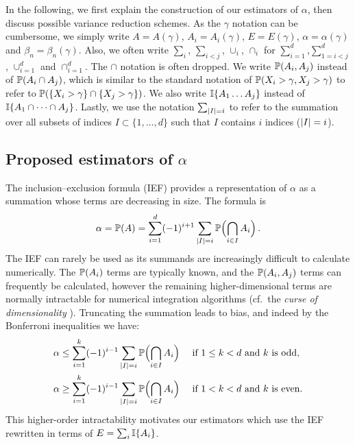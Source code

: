 In the following, we first explain the construction of our estimators of $\alpha$, then discuss possible variance reduction schemes. As the $\gamma$ notation can be cumbersome, we simply write $A=A(\gamma)$, $A_i = A_i(\gamma)$, $E = E(\gamma)$, $\alpha = \alpha(\gamma)$ and $\beta_n = \beta_n(\gamma)$. Also, we often write $\sum_i$, $\sum_{i<j}$, $\cup_i$, $\cap_i$ for $\sum_{i=1}^d$,$\sum_{1=i<j}^d$, $\cup_{i=1}^d$ and $\cap_{i=1}^d$.
The $\cap$ notation is often dropped. We write $\operatorname{{\mathbb P}}(A_i, A_j)$ instead of $\operatorname{{\mathbb P}}(A_i \cap A_j)$, which is similar to the standard notation of $\operatorname{{\mathbb P}}(X_i > \gamma, X_j > \gamma)$ to refer to $\operatorname{{\mathbb P}}(\{X_i > \gamma\} \cap \{X_j > \gamma\})$. We also write $\mathbb{I}\{  A_1 \dots A_j \}$ instead of $\mathbb{I}\{  A_1 \cap \dots \cap A_j \}$.
Lastly, we use the notation $\sum_{\lvert I\rvert = i}$ to refer to the summation over all subsets of indices $I \subset \{1, \dots, d\}$ such that $I$ contains $i$ indices ($\lvert I\rvert = i$).

\subsection{Proposed estimators of $\alpha$}

The inclusion--exclusion formula (IEF) provides a representation of $\alpha$
as a summation whose terms are decreasing in size.
The formula is
\begin{equation} \label{incl_excl}
 \alpha = \operatorname{{\mathbb P}}(A)
  =\sum_{i=1}^d  (-1)^{i+1} \sum_{\lvert I\rvert= i}  \operatorname{{\mathbb P}}\Bigl(\bigcap_{i\in I}A_i\Bigr)  \,.
\end{equation}
The IEF can rarely be used as its summands are increasingly difficult to calculate numerically.
The $\operatorname{{\mathbb P}}(A_i)$ terms are typically known, and the $\operatorname{{\mathbb P}}(A_i,A_j)$ terms can frequently be calculated, however the remaining higher-dimensional terms are normally intractable for numerical integration algorithms (cf.\ the \emph{curse of dimensionality} \cite[Chapter IX]{asmussen2007stochastic}).
Truncating the summation leads to bias, and indeed by the Bonferroni inequalities we have:
\begin{align}
  \alpha &\le \sum_{i=1}^k  (-1)^{i-1} \sum_{\lvert I\rvert= i} \operatorname{{\mathbb P}}\Bigl(\bigcap_{i\in I}A_i\Bigr) \quad \text{ if } 1\le k < d \text{ and } k \text{ is odd}, \label{bonf_odd} \\
  \alpha &\ge \sum_{i=1}^k  (-1)^{i-1} \sum_{\lvert I\rvert= i} \operatorname{{\mathbb P}}\Bigl(\bigcap_{i\in I}A_i\Bigr) \quad \text{ if } 1<k<d \text{ and } k \text{ is even}. \label{bonf_even}
\end{align}
This higher-order intractability motivates our estimators which use the IEF rewritten in terms of $E = \sum_i \mathbb{I}\{  A_i  \}$.

